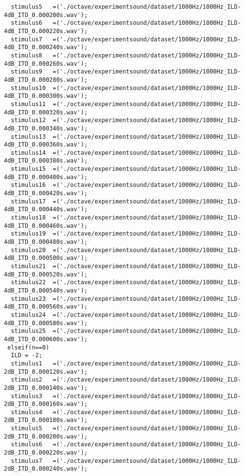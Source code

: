 {\begin{verbatim}
  stimulus5   =('./octave/experimentsound/dataset/1000Hz/1000Hz_ILD-4dB_ITD_0.000200s.wav');
  stimulus6   =('./octave/experimentsound/dataset/1000Hz/1000Hz_ILD-4dB_ITD_0.000220s.wav');
  stimulus7   =('./octave/experimentsound/dataset/1000Hz/1000Hz_ILD-4dB_ITD_0.000240s.wav');
  stimulus8   =('./octave/experimentsound/dataset/1000Hz/1000Hz_ILD-4dB_ITD_0.000260s.wav');
  stimulus9   =('./octave/experimentsound/dataset/1000Hz/1000Hz_ILD-4dB_ITD_0.000280s.wav');
  stimulus10  =('./octave/experimentsound/dataset/1000Hz/1000Hz_ILD-4dB_ITD_0.000300s.wav');
  stimulus11  =('./octave/experimentsound/dataset/1000Hz/1000Hz_ILD-4dB_ITD_0.000320s.wav');
  stimulus12  =('./octave/experimentsound/dataset/1000Hz/1000Hz_ILD-4dB_ITD_0.000340s.wav');
  stimulus13  =('./octave/experimentsound/dataset/1000Hz/1000Hz_ILD-4dB_ITD_0.000360s.wav');
  stimulus14  =('./octave/experimentsound/dataset/1000Hz/1000Hz_ILD-4dB_ITD_0.000380s.wav');
  stimulus15  =('./octave/experimentsound/dataset/1000Hz/1000Hz_ILD-4dB_ITD_0.000400s.wav');
  stimulus16  =('./octave/experimentsound/dataset/1000Hz/1000Hz_ILD-4dB_ITD_0.000420s.wav');
  stimulus17  =('./octave/experimentsound/dataset/1000Hz/1000Hz_ILD-4dB_ITD_0.000440s.wav');
  stimulus18  =('./octave/experimentsound/dataset/1000Hz/1000Hz_ILD-4dB_ITD_0.000460s.wav');
  stimulus19  =('./octave/experimentsound/dataset/1000Hz/1000Hz_ILD-4dB_ITD_0.000480s.wav');
  stimulus20  =('./octave/experimentsound/dataset/1000Hz/1000Hz_ILD-4dB_ITD_0.000500s.wav');
  stimulus21  =('./octave/experimentsound/dataset/1000Hz/1000Hz_ILD-4dB_ITD_0.000520s.wav');
  stimulus22  =('./octave/experimentsound/dataset/1000Hz/1000Hz_ILD-4dB_ITD_0.000540s.wav');
  stimulus23  =('./octave/experimentsound/dataset/1000Hz/1000Hz_ILD-4dB_ITD_0.000560s.wav');
  stimulus24  =('./octave/experimentsound/dataset/1000Hz/1000Hz_ILD-4dB_ITD_0.000580s.wav');
  stimulus25  =('./octave/experimentsound/dataset/1000Hz/1000Hz_ILD-4dB_ITD_0.000600s.wav');
 elseif(n==0)
  ILD = -2;
  stimulus1   =('./octave/experimentsound/dataset/1000Hz/1000Hz_ILD-2dB_ITD_0.000120s.wav');
  stimulus2   =('./octave/experimentsound/dataset/1000Hz/1000Hz_ILD-2dB_ITD_0.000140s.wav');
  stimulus3   =('./octave/experimentsound/dataset/1000Hz/1000Hz_ILD-2dB_ITD_0.000160s.wav');
  stimulus4   =('./octave/experimentsound/dataset/1000Hz/1000Hz_ILD-2dB_ITD_0.000180s.wav');
  stimulus5   =('./octave/experimentsound/dataset/1000Hz/1000Hz_ILD-2dB_ITD_0.000200s.wav');
  stimulus6   =('./octave/experimentsound/dataset/1000Hz/1000Hz_ILD-2dB_ITD_0.000220s.wav');
  stimulus7   =('./octave/experimentsound/dataset/1000Hz/1000Hz_ILD-2dB_ITD_0.000240s.wav');

\end{verbatim}}
